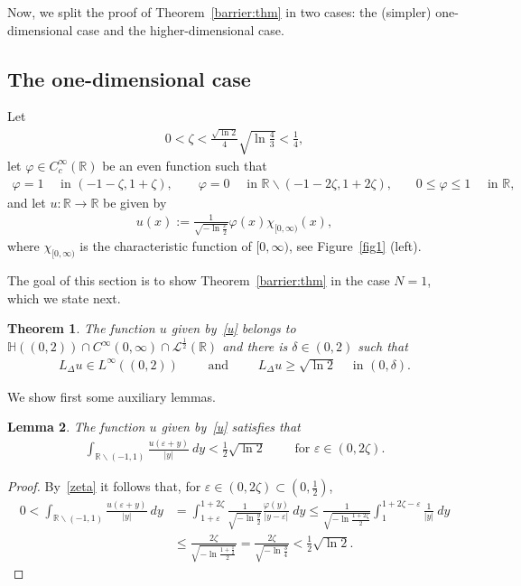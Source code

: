 \documentclass[11pt]{article}
\newcommand{\eps}{{\varepsilon}}
\newcommand{\R}{\mathbb{R}}
\numberwithin{equation}{section}
\newtheorem{theorem}{Theorem}[section]
\newtheorem{lemma}[theorem]{Lemma}
\newcommand{\cL}{{\mathcal L}}
\begin{document}
Now, we split the proof of Theorem~\ref{barrier:thm} in two cases: the (simpler) one-dimensional case and the higher-dimensional case. 

\subsection{The one-dimensional case}

Let 
\begin{align}\label{zeta}
0<\zeta<\frac{\sqrt{\ln 2}}{4}\sqrt{\ln \frac{4}{3}}<\frac{1}{4},
\end{align}
let $\varphi\in C^\infty_c(\R)$ be an even function such that
\begin{align} \label{phi:def}
\varphi=1\quad\text{ in $(-1-\zeta,1+\zeta)$},\qquad 
\varphi=0\quad \text{ in $\R\backslash (-1-2\zeta,1+2\zeta)$,}\qquad
0\leq \varphi \leq 1\quad \text{ in $\R$},
\end{align}
and let $u:\R\to\R$ be given by
 \begin{align}\label{u}
     u(x):=\frac{1}{\sqrt{-\ln \frac{x}{2}}}\varphi(x)\chi_{[0,\infty)}(x),
 \end{align}
 where $\chi_{[0,\infty)}$ is the characteristic function of $[0,\infty)$, see Figure~\ref{fig1} (left).



The goal of this section is to show Theorem~\ref{barrier:thm} in the case $N=1$, which we state next.
 
 \begin{theorem}\label{thm:L} The function $u$ given by~\eqref{u} belongs to ${\mathbb H}((0,2))\cap C^\infty(0,\infty)\cap \cL^{\frac{1}{2}}(\R)$ and there is $\delta\in(0,2)$ such that
\begin{align*}
L_\Delta u\in L^\infty((0,2))\qquad \text{ and }\qquad L_\Delta u \geq \sqrt{\ln 2}\quad \text { in }(0,\delta).
\end{align*}
\end{theorem}


We show first some auxiliary lemmas.

\begin{lemma}\label{r:lem}
The function $u$ given by~\eqref{u} satisfies that 
\begin{align*}
\int_{\R\backslash (-1,1)} \frac{u(\eps+y)}{|y|}\ dy <\frac{1}{2}\sqrt{\ln 2}\qquad \text{ for }\eps\in(0,2\zeta).
\end{align*}
\end{lemma}
\begin{proof}
By~\eqref{zeta} it follows that, for $\eps\in (0,2\zeta)\subset (0,\frac{1}{2})$,
\begin{align*}
0<\int_{\R\backslash (-1,1)} \frac{u(\eps+y)}{|y|}\ dy
&=\int_{1+\eps}^{1+2\zeta} \frac{1}{\sqrt{-\ln \frac{y}{2}}}\frac{\varphi(y)}{|y-\eps|}\ dy
\leq  \frac{1}{\sqrt{-\ln \frac{1+2\zeta}{2}}}\int_{1}^{1+2\zeta-\eps}\frac{1}{|y|}\ dy\\
&\leq\frac{2\zeta}{\sqrt{-\ln \frac{1+\frac{1}{2}}{2}}}=\frac{2\zeta}{\sqrt{-\ln \frac{3}{4}}}<\frac{1}{2}\sqrt{\ln 2}.
\end{align*}
\end{proof}
\end{document}
